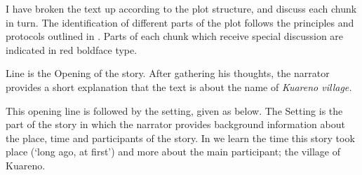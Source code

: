 I have broken the text up according to the plot structure,
and discuss each chunk in turn.
The identification of different parts of the
plot follows the principles and protocols outlined in \citet{dole01}.
Parts of each chunk which receive special discussion
are indicated in red boldface type.

Line  is the Opening of the story.
After gathering his thoughts,
the narrator provides a short explanation that the text
is about the name of \it{Kuareno{\Q}} village.

\newpage
\begin{exe}
	\label{ex:130823-2, 0.00}
\end{exe}

This opening line is followed by the setting,
given as  below.
The Setting is the part of the story in which the narrator provides
background information about the place, time and participants of the story.
In  we learn the time this story
took place (`long ago, at first') and more about the main participant; the village of Kuareno{\Q}.

\begin{exe}
	\label{ex:130823-2, 0.09-0.17}
	\begin{xlist}
		\label{ex:130823-2, 0.09}
		\label{ex:130823-2, 0.13}
		\label{ex:130823-2, 0.17}
	\end{xlist}
\end{exe}

